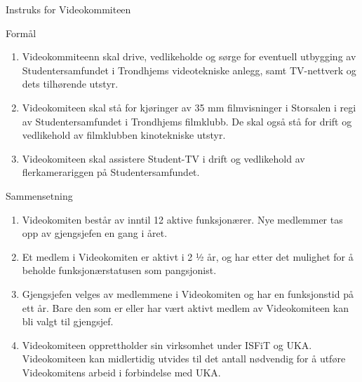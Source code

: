 
\begin{instruks}{Instruks for Videokommiteen}{ }{ }
    
    \begin{instruksledd}{Formål}
        \begin{enumerate}
            \item Videokommiteenn skal drive, vedlikeholde og sørge for eventuell
                utbygging av Studentersamfundet i
                Trondhjems videotekniske anlegg, samt TV-nettverk og dets tilhørende utstyr.
            \item Videokomiteen skal stå for kjøringer av 35 mm filmvisninger i
                Storsalen i regi av Studentersamfundet i
                Trondhjems filmklubb. De skal også stå for drift og vedlikehold av filmklubben
                kinotekniske utstyr.
            \item Videokomiteen skal assistere Student-TV i drift og vedlikehold av
                flerkamerariggen på Studentersamfundet.
        \end{enumerate}
    \end{instruksledd}

    \begin{instruksledd}{Sammensetning}
        \begin{enumerate}
            \item Videokomiten består av inntil 12 aktive funksjonærer. Nye medlemmer tas opp av
            gjengsjefen en gang i året.
            \item  Et medlem i Videokomiten er aktivt i 2 ½ år, og har etter det mulighet for å
            beholde funksjonærstatusen som
            pangsjonist.
            \item Gjengsjefen velges av medlemmene i Videokomiten og har en funksjonstid på ett
            år. Bare den som er eller
            har vært aktivt medlem av Videokomiteen kan bli valgt til gjengsjef.
            \item Videokomiteen opprettholder sin virksomhet under ISFiT og UKA. Videokomiteen
            kan midlertidig utvides
            til det antall nødvendig for å utføre Videokomitens arbeid i forbindelse med UKA.
        \end{enumerate}
    \end{instruksledd}


\end{instruks}
